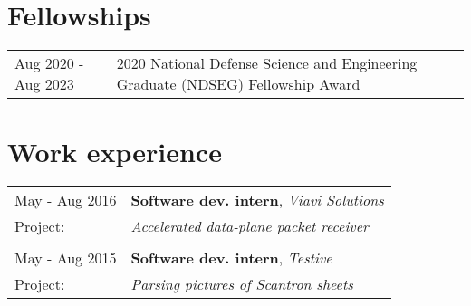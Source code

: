 \documentclass[a4paper,12pt]{article}
\begin{document}
\section{Fellowships}

\begin{tabularx}{\linewidth}{ @{}l X@{} }
  Aug 2020 - Aug 2023 & 2020 National Defense Science and Engineering Graduate (NDSEG) Fellowship Award
\end{tabularx}

\section{Work experience}
\begin{tabularx}{\linewidth}{ @{}l X@{} }
  May - Aug 2016 & \textbf{Software dev. intern}, \emph{Viavi Solutions} \\[3.75pt]
  Project: & \emph{Accelerated data-plane packet receiver} \\ \\ 
  May - Aug 2015 & \textbf{Software dev. intern}, \emph{Testive} \\[3.75pt]
  Project: & \emph{Parsing pictures of Scantron sheets} 
\end{tabularx}

\end{document}
